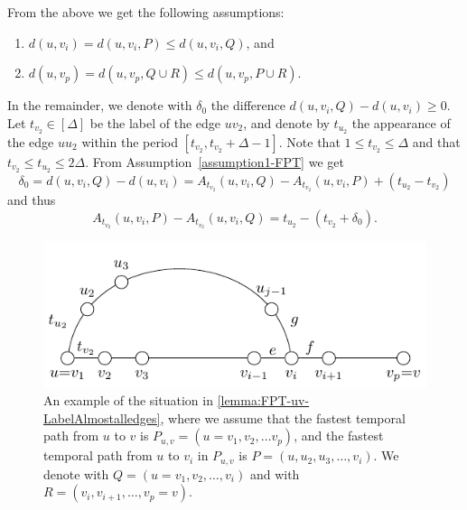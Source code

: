 \documentclass[a4paper,UKenglish,cleveref, autoref, thm-restate, anonymous]{lipics-v2021}
\begin{document}
From the above we get the following assumptions:
	\begin{enumerate}
		\item \label{assumption1-FPT} $d(u,v_{i})=d(u,v_{i},P)\leq d(u,v_{i},Q)$, and
		\item \label{assumption2-FPT} $d(u,v_p)=d(u,v_p,Q\cup R)\leq d(u,v_p,P\cup R)$.
	\end{enumerate}
In the remainder, we denote with $\delta_{0}$ the difference $d(u,v_{i},Q) - d(u,v_{i})\geq 0$.
%
 Let $t_{v_2}\in [\Delta]$ be the label of the edge $uv_2$,
	and denote by $t_{u_{2}}$ the appearance of the edge $uu_{2}$ within the
	period $[t_{v_2},t_{v_2}+\Delta -1]$. Note that $1\leq t_{v_2}\leq
	\Delta $ and that $t_{v_2}\leq t_{u_{2}}\leq 2\Delta $. 
    From Assumption~\ref{assumption1-FPT} we get
	\begin{equation*}
		\delta
		_{0}=d(u,v_{i},Q)-d(u,v_{i})=A_{t_{v_2}}(u,v_{i},Q)-A_{t_{v_2}}(u,v_{i},P)+\left( t_{u_{2}}-t_{v_2}\right)
	\end{equation*}%
	and thus%
	\begin{equation}
		A_{t_{v_2}}(u,v_{i},P)-A_{t_{v_2}}(u,v_{i},Q)=t_{u_{2}}-(t_{v_2}+\delta _{0}).
		\label{basic-eq-1}
	\end{equation}

\begin{figure}[t]
	\centering
	\includegraphics{fig-lemma}
	\caption{An example of the situation in \cref{lemma:FPT-uv-LabelAlmostalledges},
		where we assume that the fastest temporal path from $u$ to $v$ is $P_{u,v} = (u=v_1, v_2, \dots v_p)$,
		and the fastest temporal path from $u$ to $v_i$ in $P_{u,v}$ is $P = (u, u_2, u_3, \dots, v_i)$.
		We denote with $Q = (u=v_1, v_2, \dots, v_i)$ and with $R = (v_i, v_{i+1}, \dots, v_p=v)$.
		\label{fig:FPT-uv-Labelalledges}}
\end{figure}
 
\end{document}
